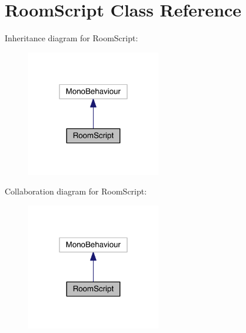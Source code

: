 \hypertarget{class_room_script}{}\section{Room\+Script Class Reference}
\label{class_room_script}


Inheritance diagram for Room\+Script\+:\nopagebreak
\begin{figure}[H]
\begin{center}
\leavevmode
\includegraphics[width=166pt]{class_room_script__inherit__graph}
\end{center}
\end{figure}


Collaboration diagram for Room\+Script\+:\nopagebreak
\begin{figure}[H]
\begin{center}
\leavevmode
\includegraphics[width=166pt]{class_room_script__coll__graph}
\end{center}
\end{figure}
